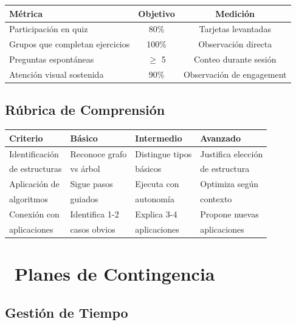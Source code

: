 \documentclass[12pt,a4paper]{article}
\begin{document}
	\begin{center}
		\begin{tabular}{|l|c|c|}
			\hline
			\textbf{Métrica} & \textbf{Objetivo} & \textbf{Medición} \\
			\hline
			Participación en quiz & 80\% & Tarjetas levantadas \\
			\hline
			Grupos que completan ejercicios & 100\% & Observación directa \\
			\hline
			Preguntas espontáneas & $\geq$ 5 & Conteo durante sesión \\
			\hline
			Atención visual sostenida & 90\% & Observación de engagement \\
			\hline
		\end{tabular}
	\end{center}
	
	\subsection*{Rúbrica de Comprensión}
	
	\begin{center}
		\begin{tabular}{|l|l|l|l|}
			\hline
			\textbf{Criterio} & \textbf{Básico} & \textbf{Intermedio} & \textbf{Avanzado} \\
			\hline
			Identificación & Reconoce grafo & Distingue tipos & Justifica elección \\
			de estructuras & vs árbol & básicos & de estructura \\
			\hline
			Aplicación de & Sigue pasos & Ejecuta con & Optimiza según \\
			algoritmos & guiados & autonomía & contexto \\
			\hline
			Conexión con & Identifica 1-2 & Explica 3-4 & Propone nuevas \\
			aplicaciones & casos obvios & aplicaciones & aplicaciones \\
			\hline
		\end{tabular}
	\end{center}
	
	\newpage
	
	\section*{\faExclamationTriangle\ Planes de Contingencia}
	
	\subsection*{Gestión de Tiempo}
	
\end{document}

